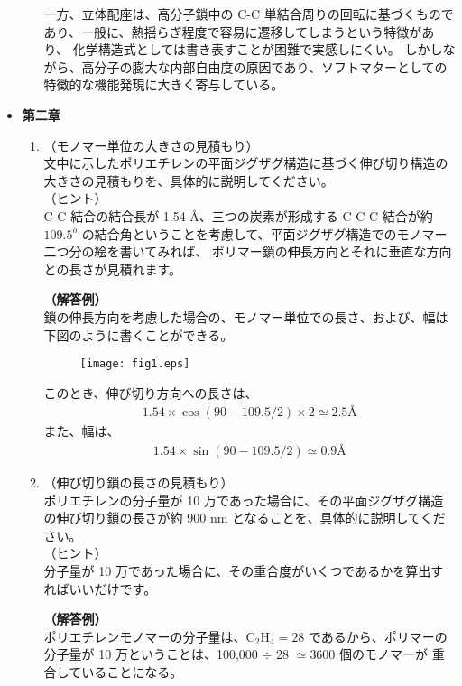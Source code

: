\documentclass[a4paper,11pt]{ltjsarticle}
\begin{document}
\begin{itemize}
\begin{enumerate}
		一方、立体配座は、高分子鎖中の C-C 単結合周りの回転に基づくものであり、一般に、熱揺らぎ程度で容易に遷移してしまうという特徴があり、
		化学構造式としては書き表すことが困難で実感しにくい。
		しかしながら、高分子の膨大な内部自由度の原因であり、ソフトマターとしての特徴的な機能発現に大きく寄与している。


	\end{enumerate}

\item
{\bf 第二章}

	\begin{enumerate}
		\item
		（モノマー単位の大きさの見積もり）\\
		文中に示したポリエチレンの平面ジグザグ構造に基づく伸び切り構造の大きさの見積もりを、具体的に説明してください。\\
		（ヒント）\\
		C-C 結合の結合長が 1.54 \AA、三つの炭素が形成する C-C-C 結合が約 $109.5^o$ の結合角ということを考慮して、平面ジグザグ構造でのモノマー二つ分の絵を書いてみれば、
		ポリマー鎖の伸長方向とそれに垂直な方向との長さが見積れます。

		{\bf（解答例）}\\
		鎖の伸長方向を考慮した場合の、モノマー単位での長さ、および、幅は下図のように書くことができる。
		\begin{figure}[htb]
		\centering
		\texttt{[image: fig1.eps]}
		\end{figure}

		このとき、伸び切り方向への長さは、
		\begin{align*}
		1.54 \times \cos (90 - 109.5/2) \times 2 \simeq 2.5 \text{\AA}
		\end{align*}
		また、幅は、
		\begin{align*}
		1.54 \times \sin (90 - 109.5/2) \simeq 0.9 \text{\AA}
		\end{align*}

		\item
		（伸び切り鎖の長さの見積もり）\\
		ポリエチレンの分子量が 10 万であった場合に、その平面ジグザグ構造の伸び切り鎖の長さが約 900 nm となることを、具体的に説明してください。\\
		（ヒント）\\
		分子量が 10 万であった場合に、その重合度がいくつであるかを算出すればいいだけです。

		{\bf（解答例）}\\
		ポリエチレンモノマーの分子量は、C$_2$H$_4 = 28$ であるから、ポリマーの分子量が 10 万ということは、100,000 $\div$ 28 $\simeq $3600 個のモノマーが
		重合していることになる。


\end{enumerate}
\end{itemize}
\end{document}
